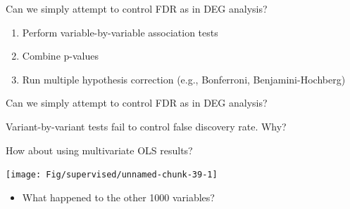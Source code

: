 \documentclass[
  ignorenonframetext,
  aspectratio=169]{beamer}
\providecommand{\tightlist}{%
  \setlength{\itemsep}{0pt}\setlength{\parskip}{0pt}}
\begin{document}
\begin{frame}{Can we simply attempt to control FDR as in DEG analysis?}
\protect\hypertarget{can-we-simply-attempt-to-control-fdr-as-in-deg-analysis}{}
\Large

\begin{enumerate}
\item
  Perform variable-by-variable association tests
\item
  Combine p-values
\item
  Run multiple hypothesis correction (e.g., Bonferroni,
  Benjamini-Hochberg)
\end{enumerate}
\end{frame}

\begin{frame}{Can we simply attempt to control FDR as in DEG analysis?}
\protect\hypertarget{can-we-simply-attempt-to-control-fdr-as-in-deg-analysis-1}{}
\scriptsize

\normalsize

\scriptsize


\normalsize

\scriptsize


\normalsize

Variant-by-variant tests fail to control false discovery rate. Why?
\end{frame}

\begin{frame}{How about using multivariate OLS results?}
\protect\hypertarget{how-about-using-multivariate-ols-results}{}
\scriptsize

\begin{center}\texttt{[image: Fig/supervised/unnamed-chunk-39-1]} \end{center}

\normalsize

\begin{itemize}
\tightlist
\item
  What happened to the other 1000 variables?
\end{itemize}
\end{frame}
\end{document}
